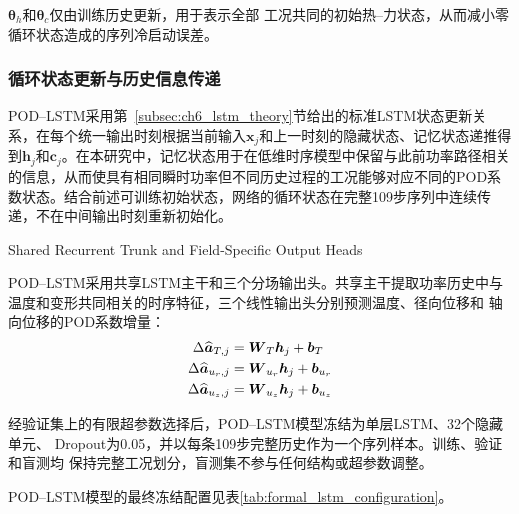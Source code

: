 $\boldsymbol\theta_h$和$\boldsymbol\theta_c$仅由训练历史更新，用于表示全部
工况共同的初始热--力状态，从而减小零循环状态造成的序列冷启动误差。

\subsubsection{循环状态更新与历史信息传递}

POD--LSTM采用第~\ref{subsec:ch6_lstm_theory}节给出的标准LSTM状态更新关系，在每个统一输出时刻根据当前输入$\boldsymbol x_j$和上一时刻的隐藏状态、记忆状态递推得到$\boldsymbol h_j$和$\boldsymbol c_j$。在本研究中，记忆状态用于在低维时序模型中保留与此前功率路径相关的信息，从而使具有相同瞬时功率但不同历史过程的工况能够对应不同的POD系数状态。结合前述可训练初始状态，网络的循环状态在完整109步序列中连续传递，不在中间输出时刻重新初始化。

{Shared Recurrent Trunk and Field-Specific Output Heads}

POD--LSTM采用共享LSTM主干和三个分场输出头。共享主干提取功率历史中与
温度和变形共同相关的时序特征，三个线性输出头分别预测温度、径向位移和
轴向位移的POD系数增量：
\begin{align}
	\Delta\widehat{\boldsymbol a}_{T,j}
	&=\boldsymbol W_T\boldsymbol h_j+\boldsymbol b_T
	\notag\\
	\Delta\widehat{\boldsymbol a}_{u_r,j}
	&=\boldsymbol W_{u_r}\boldsymbol h_j+\boldsymbol b_{u_r}
	\notag\\
	\Delta\widehat{\boldsymbol a}_{u_z,j}
	&=\boldsymbol W_{u_z}\boldsymbol h_j+\boldsymbol b_{u_z}
	\label{eq:formal_lstm_heads}
\end{align}

经验证集上的有限超参数选择后，POD--LSTM模型冻结为单层LSTM、32个隐藏单元、
Dropout为0.05，并以每条109步完整历史作为一个序列样本。训练、验证和盲测均
保持完整工况划分，盲测集不参与任何结构或超参数调整。

POD--LSTM模型的最终冻结配置见表\ref{tab:formal_lstm_configuration}。

